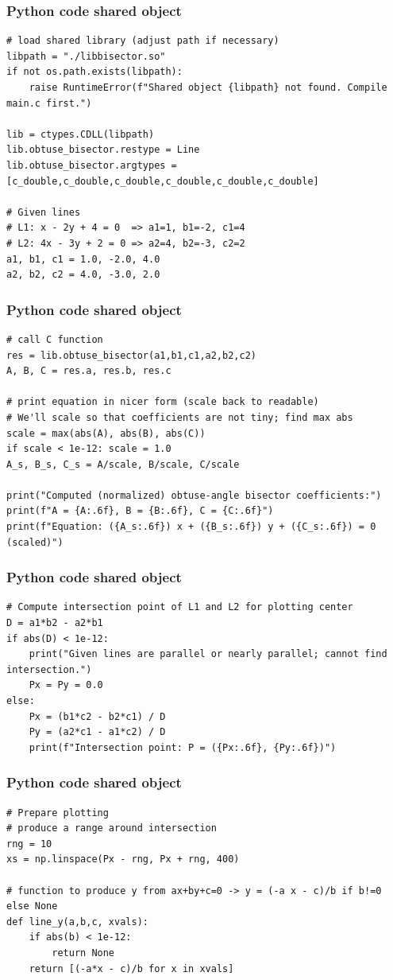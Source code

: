 \documentclass{beamer}
\begin{document}
\begin{frame}[fragile]
\frametitle{Python code shared object}
\begin{lstlisting}
# load shared library (adjust path if necessary)
libpath = "./libbisector.so"
if not os.path.exists(libpath):
    raise RuntimeError(f"Shared object {libpath} not found. Compile main.c first.")

lib = ctypes.CDLL(libpath)
lib.obtuse_bisector.restype = Line
lib.obtuse_bisector.argtypes = [c_double,c_double,c_double,c_double,c_double,c_double]

# Given lines
# L1: x - 2y + 4 = 0  => a1=1, b1=-2, c1=4
# L2: 4x - 3y + 2 = 0 => a2=4, b2=-3, c2=2
a1, b1, c1 = 1.0, -2.0, 4.0
a2, b2, c2 = 4.0, -3.0, 2.0
\end{lstlisting}
\end{frame}
\begin{frame}[fragile]
\frametitle{Python code shared object}
\begin{lstlisting}
# call C function
res = lib.obtuse_bisector(a1,b1,c1,a2,b2,c2)
A, B, C = res.a, res.b, res.c

# print equation in nicer form (scale back to readable)
# We'll scale so that coefficients are not tiny; find max abs
scale = max(abs(A), abs(B), abs(C))
if scale < 1e-12: scale = 1.0
A_s, B_s, C_s = A/scale, B/scale, C/scale

print("Computed (normalized) obtuse-angle bisector coefficients:")
print(f"A = {A:.6f}, B = {B:.6f}, C = {C:.6f}")
print(f"Equation: ({A_s:.6f}) x + ({B_s:.6f}) y + ({C_s:.6f}) = 0   (scaled)")
\end{lstlisting}
\end{frame}
\begin{frame}[fragile]
\frametitle{Python code shared object}
\begin{lstlisting}
# Compute intersection point of L1 and L2 for plotting center
D = a1*b2 - a2*b1
if abs(D) < 1e-12:
    print("Given lines are parallel or nearly parallel; cannot find intersection.")
    Px = Py = 0.0
else:
    Px = (b1*c2 - b2*c1) / D
    Py = (a2*c1 - a1*c2) / D
    print(f"Intersection point: P = ({Px:.6f}, {Py:.6f})")
\end{lstlisting}
\end{frame}
\begin{frame}[fragile]
\frametitle{Python code shared object}
\begin{lstlisting}
# Prepare plotting
# produce a range around intersection
rng = 10
xs = np.linspace(Px - rng, Px + rng, 400)

# function to produce y from ax+by+c=0 -> y = (-a x - c)/b if b!=0 else None
def line_y(a,b,c, xvals):
    if abs(b) < 1e-12:
        return None
    return [(-a*x - c)/b for x in xvals]
\end{lstlisting}
\end{frame}
\end{document}
